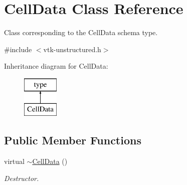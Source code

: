 \hypertarget{classCellData}{\section{Cell\-Data Class Reference}
\label{classCellData}
}


Class corresponding to the Cell\-Data schema type.  




{\ttfamily \#include $<$vtk-\/unstructured.\-h$>$}

Inheritance diagram for Cell\-Data\-:\begin{figure}[H]
\begin{center}
\leavevmode
\includegraphics[height=2.000000cm]{classCellData}
\end{center}
\end{figure}
\subsection*{Public Member Functions}
\begin{DoxyCompactItemize}
\item 
virtual \hyperlink{classCellData_aaf439852120aadb5a267799e2a7bf2a3}{$\sim$\-Cell\-Data} ()
\begin{DoxyCompactList}\small\item\em Destructor. \end{DoxyCompactList}\end{DoxyCompactItemize}
